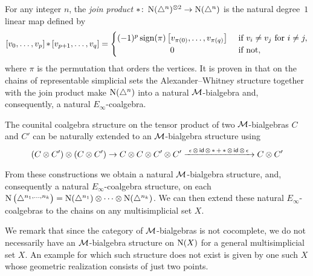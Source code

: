 For any integer $n$, the \textit{join product} $\ast \colon \operatorname{N}(\triangle^n)^{\otimes 2} \to \operatorname{N}(\triangle^n)$ is the natural degree~$1$ linear map defined by
\begin{equation*}
	\left[v_0, \dots, v_p \right] \pr \left[v_{p+1}, \dots, v_q\right] =
	\begin{cases} (-1)^{p} \sign(\pi) \left[v_{\pi(0)}, \dots, v_{\pi(q)}\right] & \text{ if } v_i \neq v_j \text{ for } i \neq j, \\
		\hfil 0 & \text{ if not}, \end{cases}
\end{equation*}
where $\pi$ is the permutation that orders the vertices.
It is proven in \cite{medina2020prop1} that on the chains of representable simplicial sets the Alexander--Whitney structure together with the join product make $\operatorname{N}(\triangle^n)$ into a natural $\mathcal{M}$-bialgebra and, consequently, a natural $E_\infty$-coalgebra.

%	

The counital coalgebra structure on the tensor product of two $\mathcal{M}$-bialgebras $C$ and $C'$ can be naturally extended to an $\mathcal{M}$-bialgebra structure using
\[
(C \otimes C^\prime) \otimes (C \otimes C^\prime) \to
C \otimes C \otimes C^\prime \otimes C^\prime
\xrightarrow{\ \operatorname{\epsilon} \otimes \, \mathsf{id} \, \otimes \, \operatorname{\ast} + \operatorname{\ast} \otimes \, \mathsf{id} \, \otimes \,\operatorname{\epsilon}\ }
C \otimes C^\prime
\]

From these constructions we obtain a natural $\mathcal{M}$-bialgebra structure, and, consequently a natural $E_\infty$-coalgebra structure, on each $\operatorname{N} \big( \triangle^{n_1, \dots, n_k} \big) = \operatorname{N}(\triangle^{n_1}) \otimes \dotsb \otimes \operatorname{N}(\triangle^{n_k})$.
We can then extend these natural $E_\infty$-coalgebras to the chains on any multisimplicial set $X$.

We remark that since the category of $\mathcal{M}$-bialgebras is not cocomplete, we do not necessarily have an $\mathcal{M}$-bialgebra structure on $\operatorname{N}(X)$ for a general multisimplicial set $X$.
An example for which such structure does not exist is given by one such $X$ whose geometric realization consists of just two points.

